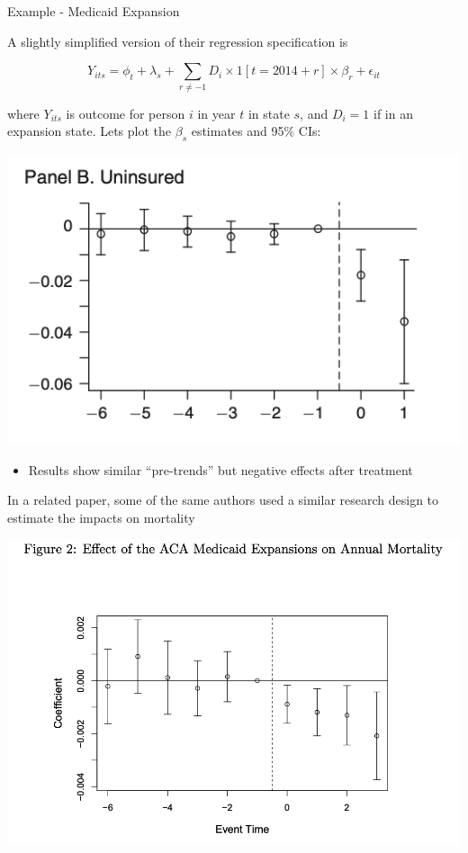 \documentclass[11pt,english,handout]{beamer}
\newenvironment{wideitemize}{\itemize\addtolength{\itemsep}{10pt}}{\enditemize}
\begin{document}
\begin{frame}{Example - Medicaid Expansion}
	\begin{wideitemize}
		\item
		A slightly simplified version of their regression specification is
		
		$$Y_{its} =  \phi_{t} + \lambda_s + \sum_{r\neq -1}  D_i \times 1[t = 2014 + r] \times  \beta_r   + \epsilon_{it} $$
		
		\noindent where $Y_{its}$ is outcome for person $i$ in year $t$ in state $s$, and $D_i = 1$ if in an expansion state.\pause{} Lets plot the $\beta_s$ estimates and 95\% CIs:
	\end{wideitemize}\pause{}
	
	
	\begin{center}
		\includegraphics[width = 0.6 \linewidth]{carey-event-study}
	\end{center}
	
	
	\pause
	\begin{itemize}
		\item
		Results show similar ``pre-trends'' but negative effects after treatment 
	\end{itemize}

\end{frame}


\begin{frame}
In a related paper, some of the same authors used a similar research design to estimate the impacts on mortality
\begin{center}
\includegraphics[width = 0.7\linewidth]{medicaid-mortality}
\end{center}
\end{frame}
\end{document}
